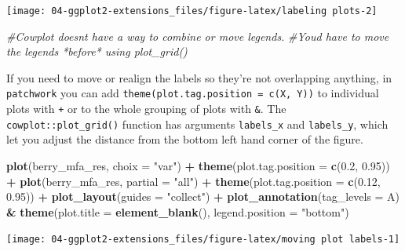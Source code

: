 \documentclass[
]{book}
\newenvironment{Shaded}{\begin{snugshade}}{\end{snugshade}}
\newcommand{\AttributeTok}[1]{\textcolor[rgb]{0.13,0.29,0.53}{#1}}
\newcommand{\CommentTok}[1]{\textcolor[rgb]{0.56,0.35,0.01}{\textit{#1}}}
\newcommand{\FloatTok}[1]{\textcolor[rgb]{0.00,0.00,0.81}{#1}}
\newcommand{\FunctionTok}[1]{\textcolor[rgb]{0.13,0.29,0.53}{\textbf{#1}}}
\newcommand{\NormalTok}[1]{#1}
\newcommand{\SpecialCharTok}[1]{\textcolor[rgb]{0.81,0.36,0.00}{\textbf{#1}}}
\newcommand{\StringTok}[1]{\textcolor[rgb]{0.31,0.60,0.02}{#1}}
\begin{document}
\begin{center}\texttt{[image: 04-ggplot2-extensions\_files/figure-latex/labeling plots-2]} \end{center}

\begin{Shaded}
\begin{Highlighting}[]
\CommentTok{\#Cowplot doesn\textquotesingle{}t have a way to combine or move legends.}
\CommentTok{\#You\textquotesingle{}d have to move the legends *before* using plot\_grid()}
\end{Highlighting}
\end{Shaded}

If you need to move or realign the labels so they're not overlapping anything, in \texttt{patchwork} you can add \texttt{theme(plot.tag.position\ =\ c(X,\ Y))} to individual plots with \texttt{+} or to the whole grouping of plots with \texttt{\&}. The \texttt{cowplot::plot\_grid()} function has arguments \texttt{labels\_x} and \texttt{labels\_y}, which let you adjust the distance from the bottom left hand corner of the figure.

\begin{Shaded}
\begin{Highlighting}[]
\FunctionTok{plot}\NormalTok{(berry\_mfa\_res, }\AttributeTok{choix =} \StringTok{"var"}\NormalTok{) }\SpecialCharTok{+} \FunctionTok{theme}\NormalTok{(}\AttributeTok{plot.tag.position =} \FunctionTok{c}\NormalTok{(}\FloatTok{0.2}\NormalTok{, }\FloatTok{0.95}\NormalTok{)) }\SpecialCharTok{+}
  \FunctionTok{plot}\NormalTok{(berry\_mfa\_res, }\AttributeTok{partial =} \StringTok{"all"}\NormalTok{) }\SpecialCharTok{+} \FunctionTok{theme}\NormalTok{(}\AttributeTok{plot.tag.position =} \FunctionTok{c}\NormalTok{(}\FloatTok{0.12}\NormalTok{, }\FloatTok{0.95}\NormalTok{)) }\SpecialCharTok{+}
  \FunctionTok{plot\_layout}\NormalTok{(}\AttributeTok{guides =} \StringTok{"collect"}\NormalTok{) }\SpecialCharTok{+}
  \FunctionTok{plot\_annotation}\NormalTok{(}\AttributeTok{tag\_levels =} \StringTok{\textquotesingle{}A\textquotesingle{}}\NormalTok{) }\SpecialCharTok{\&}
  \FunctionTok{theme}\NormalTok{(}\AttributeTok{plot.title =} \FunctionTok{element\_blank}\NormalTok{(),}
        \AttributeTok{legend.position =} \StringTok{"bottom"}\NormalTok{)}
\end{Highlighting}
\end{Shaded}

\begin{center}\texttt{[image: 04-ggplot2-extensions\_files/figure-latex/moving plot labels-1]} \end{center}
\end{document}
